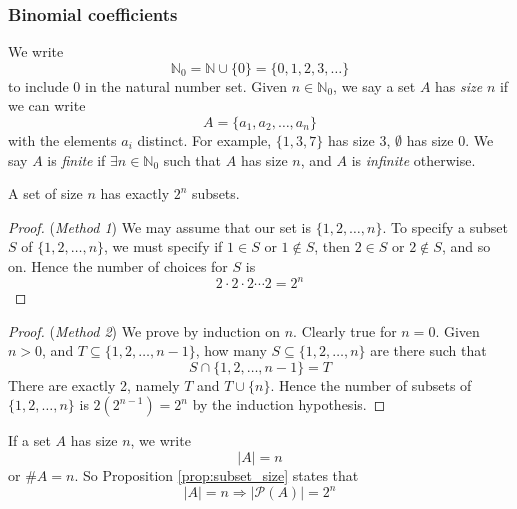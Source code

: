 \documentclass[10pt, a4paper, twoside]{report}
\begin{document}
\subsubsection{Binomial coefficients}
We write 
\[\mathbb{N}_0=\mathbb{N}\cup\{0\}=\{0,1,2,3,\ldots\}\]
to include \(0\) in the natural number set. Given \(n\in\mathbb{N}_0\), we say a set \(A\) has \emph{size} \(n\) if we can write 
\[A=\{a_1,a_2,\ldots,a_n\}\] 
with the elements \(a_i\) distinct.
For example, \(\{1,3,7\}\) has size \(3\), \(\emptyset\) has size \(0\). We say \(A\) is \emph{finite} if \(\exists n\in\mathbb{N}_0\) such that \(A\) has size \(n\), and \(A\) is \emph{infinite} otherwise.
\begin{proposition}
    A set of size \(n\) has exactly \(2^n\) subsets.
    \label{prop:subset_size}
\end{proposition}
\begin{proof}
    (\emph{Method 1}) We may assume that our set is \(\{1,2,\ldots,n\}\). To specify a subset \(S\) of \(\{1,2,\ldots,n\}\), we must specify if \(1\in S\) or \(1\notin S\), then \(2\in S\) or \(2\notin S\), and so on. Hence the number of choices for \(S\) is 
    \[2\cdot 2\cdot 2\cdots 2=2^n\]
\end{proof}
\begin{proof}
    (\emph{Method 2}) We prove by induction on \(n\). Clearly true for \(n=0\). Given \(n>0\), and \(T\subseteq\{1,2,\ldots,n-1\}\), how many \(S\subseteq\{1,2,\ldots,n\}\) are there such that 
    \[S\cap\{1,2,\ldots,n-1\}=T\]
    There are exactly 2, namely \(T\) and \(T\cup\{n\}\). Hence the number of subsets of \(\{1,2,\ldots,n\}\) is \(2(2^{n-1})=2^n\) by the induction hypothesis.
\end{proof}
If a set \(A\) has size \(n\), we write 
\[|A|=n\]
or \(\# A=n\). So Proposition \ref{prop:subset_size} states that
\[|A|=n\Rightarrow|\mathcal{P}(A)|=2^n\]
\end{document}
